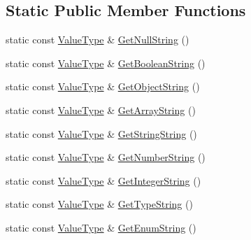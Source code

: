 \subsection*{Static Public Member Functions}
\begin{DoxyCompactItemize}
\item 
static const \mbox{\hyperlink{classrapidjson_1_1internal_1_1_schema_a3979a9083c598195927c08c6e3ba91d1}{Value\+Type}} \& \mbox{\hyperlink{classrapidjson_1_1internal_1_1_schema_a210927a7f52f9f2adecfc542021ea106}{Get\+Null\+String}} ()
\item 
static const \mbox{\hyperlink{classrapidjson_1_1internal_1_1_schema_a3979a9083c598195927c08c6e3ba91d1}{Value\+Type}} \& \mbox{\hyperlink{classrapidjson_1_1internal_1_1_schema_a2048067b04f4ae9fa2523ab41037f7ac}{Get\+Boolean\+String}} ()
\item 
static const \mbox{\hyperlink{classrapidjson_1_1internal_1_1_schema_a3979a9083c598195927c08c6e3ba91d1}{Value\+Type}} \& \mbox{\hyperlink{classrapidjson_1_1internal_1_1_schema_a0748f16e201e9af8100281559c74ec06}{Get\+Object\+String}} ()
\item 
static const \mbox{\hyperlink{classrapidjson_1_1internal_1_1_schema_a3979a9083c598195927c08c6e3ba91d1}{Value\+Type}} \& \mbox{\hyperlink{classrapidjson_1_1internal_1_1_schema_a64a880ad9ff583a1a8408b2db85b0c7f}{Get\+Array\+String}} ()
\item 
static const \mbox{\hyperlink{classrapidjson_1_1internal_1_1_schema_a3979a9083c598195927c08c6e3ba91d1}{Value\+Type}} \& \mbox{\hyperlink{classrapidjson_1_1internal_1_1_schema_a5e83b472e7eb8bc204c2742c965a1a4e}{Get\+String\+String}} ()
\item 
static const \mbox{\hyperlink{classrapidjson_1_1internal_1_1_schema_a3979a9083c598195927c08c6e3ba91d1}{Value\+Type}} \& \mbox{\hyperlink{classrapidjson_1_1internal_1_1_schema_a86d57b8fe17ab5f909ca4d775244fae1}{Get\+Number\+String}} ()
\item 
static const \mbox{\hyperlink{classrapidjson_1_1internal_1_1_schema_a3979a9083c598195927c08c6e3ba91d1}{Value\+Type}} \& \mbox{\hyperlink{classrapidjson_1_1internal_1_1_schema_a350df9656dcb72ed1434793bca440426}{Get\+Integer\+String}} ()
\item 
static const \mbox{\hyperlink{classrapidjson_1_1internal_1_1_schema_a3979a9083c598195927c08c6e3ba91d1}{Value\+Type}} \& \mbox{\hyperlink{classrapidjson_1_1internal_1_1_schema_a43211fb10edc233e20ef8edbf69e84c8}{Get\+Type\+String}} ()
\item 
static const \mbox{\hyperlink{classrapidjson_1_1internal_1_1_schema_a3979a9083c598195927c08c6e3ba91d1}{Value\+Type}} \& \mbox{\hyperlink{classrapidjson_1_1internal_1_1_schema_ac8f15b38f0f83142b538af89910ac5a6}{Get\+Enum\+String}} ()

\end{DoxyCompactItemize}
